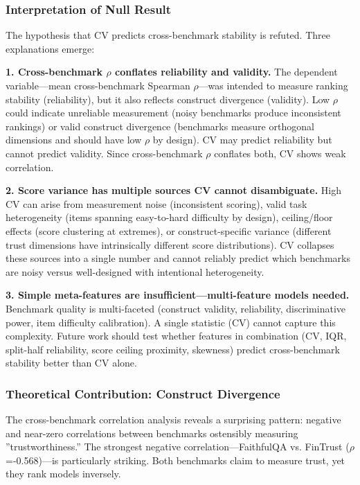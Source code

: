 
\subsubsection{Interpretation of Null Result}

The hypothesis that CV predicts cross-benchmark stability is refuted. Three explanations emerge:

\textbf{1. Cross-benchmark $\rho$ conflates reliability and validity.} The dependent variable---mean cross-benchmark Spearman $\rho$---was intended to measure ranking stability (reliability), but it also reflects construct divergence (validity). Low $\rho$ could indicate unreliable measurement (noisy benchmarks produce inconsistent rankings) or valid construct divergence (benchmarks measure orthogonal dimensions and should have low $\rho$ by design). CV may predict reliability but cannot predict validity. Since cross-benchmark $\rho$ conflates both, CV shows weak correlation.

\textbf{2. Score variance has multiple sources CV cannot disambiguate.} High CV can arise from measurement noise (inconsistent scoring), valid task heterogeneity (items spanning easy-to-hard difficulty by design), ceiling/floor effects (score clustering at extremes), or construct-specific variance (different trust dimensions have intrinsically different score distributions). CV collapses these sources into a single number and cannot reliably predict which benchmarks are noisy versus well-designed with intentional heterogeneity.

\textbf{3. Simple meta-features are insufficient---multi-feature models needed.} Benchmark quality is multi-faceted (construct validity, reliability, discriminative power, item difficulty calibration). A single statistic (CV) cannot capture this complexity. Future work should test whether features in combination (CV, IQR, split-half reliability, score ceiling proximity, skewness) predict cross-benchmark stability better than CV alone.

\subsubsection{Theoretical Contribution: Construct Divergence}

The cross-benchmark correlation analysis reveals a surprising pattern: negative and near-zero correlations between benchmarks ostensibly measuring ''trustworthiness.'' The strongest negative correlation---FaithfulQA vs. FinTrust ($\rho$=-0.568)---is particularly striking. Both benchmarks claim to measure trust, yet they rank models inversely.

